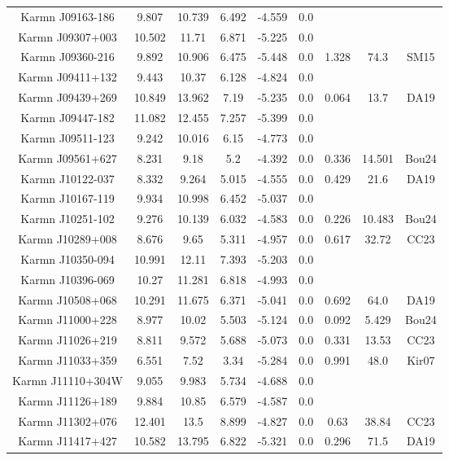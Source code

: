 \begin{longtable}{ccccccccc}
    Karmn J09163-186 & 9.807 & 10.739 & 6.492 & -4.559 & 0.0 &  &  &  \\
    Karmn J09307+003 & 10.502 & 11.71 & 6.871 & -5.225 & 0.0 &  &  &  \\
    Karmn J09360-216 & 9.892 & 10.906 & 6.475 & -5.448 & 0.0 & 1.328 & 74.3 & SM15 \\
    Karmn J09411+132 & 9.443 & 10.37 & 6.128 & -4.824 & 0.0 &  &  &  \\
    Karmn J09439+269 & 10.849 & 13.962 & 7.19 & -5.235 & 0.0 & 0.064 & 13.7 & DA19 \\
    Karmn J09447-182 & 11.082 & 12.455 & 7.257 & -5.399 & 0.0 &  &  &  \\
    Karmn J09511-123 & 9.242 & 10.016 & 6.15 & -4.773 & 0.0 &  &  &  \\
    Karmn J09561+627 & 8.231 & 9.18 & 5.2 & -4.392 & 0.0 & 0.336 & 14.501 & Bou24 \\
    Karmn J10122-037 & 8.332 & 9.264 & 5.015 & -4.555 & 0.0 & 0.429 & 21.6 & DA19 \\
    Karmn J10167-119 & 9.934 & 10.998 & 6.452 & -5.037 & 0.0 &  &  &  \\
    Karmn J10251-102 & 9.276 & 10.139 & 6.032 & -4.583 & 0.0 & 0.226 & 10.483 & Bou24 \\
    Karmn J10289+008 & 8.676 & 9.65 & 5.311 & -4.957 & 0.0 & 0.617 & 32.72 & CC23 \\
    Karmn J10350-094 & 10.991 & 12.11 & 7.393 & -5.203 & 0.0 &  &  &  \\
    Karmn J10396-069 & 10.27 & 11.281 & 6.818 & -4.993 & 0.0 &  &  &  \\
    Karmn J10508+068 & 10.291 & 11.675 & 6.371 & -5.041 & 0.0 & 0.692 & 64.0 & DA19 \\
    Karmn J11000+228 & 8.977 & 10.02 & 5.503 & -5.124 & 0.0 & 0.092 & 5.429 & Bou24 \\
    Karmn J11026+219 & 8.811 & 9.572 & 5.688 & -5.073 & 0.0 & 0.331 & 13.53 & CC23 \\
    Karmn J11033+359 & 6.551 & 7.52 & 3.34 & -5.284 & 0.0 & 0.991 & 48.0 & Kir07 \\
    Karmn J11110+304W & 9.055 & 9.983 & 5.734 & -4.688 & 0.0 &  &  &  \\
    Karmn J11126+189 & 9.884 & 10.85 & 6.579 & -4.587 & 0.0 &  &  &  \\
    Karmn J11302+076 & 12.401 & 13.5 & 8.899 & -4.827 & 0.0 & 0.63 & 38.84 & CC23 \\
    Karmn J11417+427 & 10.582 & 13.795 & 6.822 & -5.321 & 0.0 & 0.296 & 71.5 & DA19 \\

\end{longtable}
